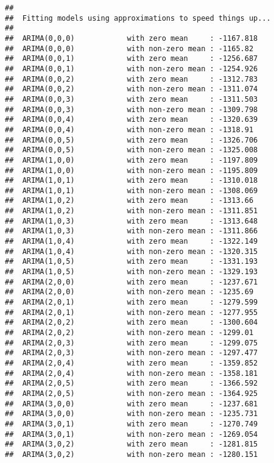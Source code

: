 \documentclass[]{article}
\begin{document}
\begin{verbatim}
## 
##  Fitting models using approximations to speed things up...
## 
##  ARIMA(0,0,0)            with zero mean     : -1167.818
##  ARIMA(0,0,0)            with non-zero mean : -1165.82
##  ARIMA(0,0,1)            with zero mean     : -1256.687
##  ARIMA(0,0,1)            with non-zero mean : -1254.926
##  ARIMA(0,0,2)            with zero mean     : -1312.783
##  ARIMA(0,0,2)            with non-zero mean : -1311.074
##  ARIMA(0,0,3)            with zero mean     : -1311.503
##  ARIMA(0,0,3)            with non-zero mean : -1309.798
##  ARIMA(0,0,4)            with zero mean     : -1320.639
##  ARIMA(0,0,4)            with non-zero mean : -1318.91
##  ARIMA(0,0,5)            with zero mean     : -1326.706
##  ARIMA(0,0,5)            with non-zero mean : -1325.008
##  ARIMA(1,0,0)            with zero mean     : -1197.809
##  ARIMA(1,0,0)            with non-zero mean : -1195.809
##  ARIMA(1,0,1)            with zero mean     : -1310.018
##  ARIMA(1,0,1)            with non-zero mean : -1308.069
##  ARIMA(1,0,2)            with zero mean     : -1313.66
##  ARIMA(1,0,2)            with non-zero mean : -1311.851
##  ARIMA(1,0,3)            with zero mean     : -1313.648
##  ARIMA(1,0,3)            with non-zero mean : -1311.866
##  ARIMA(1,0,4)            with zero mean     : -1322.149
##  ARIMA(1,0,4)            with non-zero mean : -1320.315
##  ARIMA(1,0,5)            with zero mean     : -1331.193
##  ARIMA(1,0,5)            with non-zero mean : -1329.193
##  ARIMA(2,0,0)            with zero mean     : -1237.671
##  ARIMA(2,0,0)            with non-zero mean : -1235.69
##  ARIMA(2,0,1)            with zero mean     : -1279.599
##  ARIMA(2,0,1)            with non-zero mean : -1277.955
##  ARIMA(2,0,2)            with zero mean     : -1300.604
##  ARIMA(2,0,2)            with non-zero mean : -1299.01
##  ARIMA(2,0,3)            with zero mean     : -1299.075
##  ARIMA(2,0,3)            with non-zero mean : -1297.477
##  ARIMA(2,0,4)            with zero mean     : -1359.852
##  ARIMA(2,0,4)            with non-zero mean : -1358.181
##  ARIMA(2,0,5)            with zero mean     : -1366.592
##  ARIMA(2,0,5)            with non-zero mean : -1364.925
##  ARIMA(3,0,0)            with zero mean     : -1237.681
##  ARIMA(3,0,0)            with non-zero mean : -1235.731
##  ARIMA(3,0,1)            with zero mean     : -1270.749
##  ARIMA(3,0,1)            with non-zero mean : -1269.054
##  ARIMA(3,0,2)            with zero mean     : -1281.815
##  ARIMA(3,0,2)            with non-zero mean : -1280.151

\end{verbatim}
\end{document}
